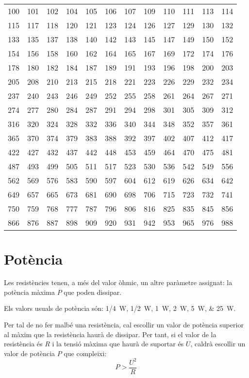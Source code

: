 \begin{center}
   \begin{tabular}{cccccccccccc}
   \toprule[1pt]
   100 & 101 & 102 & 104 & 105 & 106 & 107 & 109 & 110 & 111 & 113 & 114 \\
   115 & 117 & 118 & 120 & 121 & 123 & 124 & 126 & 127 & 129 & 130 & 132 \\
   133 & 135 & 137 & 138 & 140 & 142 & 143 & 145 & 147 & 149 & 150 & 152 \\
   154 & 156 & 158 & 160 & 162 & 164 & 165 & 167 & 169 & 172 & 174 & 176 \\
   178 & 180 & 182 & 184 & 187 & 189 & 191 & 193 & 196 & 198 & 200 & 203 \\
   205 & 208 & 210 & 213 & 215 & 218 & 221 & 223 & 226 & 229 & 232 & 234 \\
   237 & 240 & 243 & 246 & 249 & 252 & 255 & 258 & 261 & 264 & 267 & 271 \\
   274 & 277 & 280 & 284 & 287 & 291 & 294 & 298 & 301 & 305 & 309 & 312 \\
   316 & 320 & 324 & 328 & 332 & 336 & 340 & 344 & 348 & 352 & 357 & 361 \\
   365 & 370 & 374 & 379 & 383 & 388 & 392 & 397 & 402 & 407 & 412 & 417 \\
   422 & 427 & 432 & 437 & 442 & 448 & 453 & 459 & 464 & 470 & 475 & 481 \\
   487 & 493 & 499 & 505 & 511 & 517 & 523 & 530 & 536 & 542 & 549 & 556 \\
   562 & 569 & 576 & 583 & 590 & 597 & 604 & 612 & 619 & 626 & 634 & 642 \\
   649 & 657 & 665 & 673 & 681 & 690 & 698 & 706 & 715 & 723 & 732 & 741 \\
   750 & 759 & 768 & 777 & 787 & 796 & 806 & 816 & 825 & 835 & 845 & 856 \\
   866 & 876 & 887 & 898 & 909 & 920 & 931 & 942 & 953 & 965 & 976 & 988 \\
   \bottomrule[1pt]
   \end{tabular}
\end{center}


\section{Potència} \label{sec:resist-pot}

Les resistències tenen, a més del valor òhmic, un altre paràmetre assignat: la potència màxima $P$ que poden dissipar.

Els valors usuals de potència són: \SIlist{1/4;1/2;1;2;5;25}{W}.

Per tal de no fer malbé una resistència, cal escollir un valor de potència superior al màxim que la resistència haurà de dissipar. Per tant, si el valor de la resistència és $R$ i la tensió màxima que haurà de suportar és $U$, caldrà escollir un valor de potència $P$ que compleixi:
\begin{equation}
  P > \frac{U^2}{R}
\end{equation}

